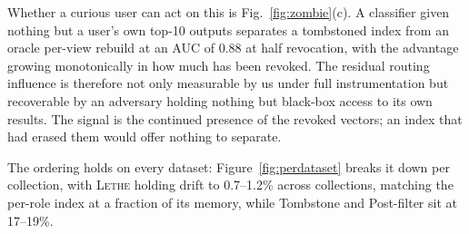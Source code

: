 \documentclass[sigconf, nonacm, review]{acmart}
\begin{document}
Whether a curious user can act on this is Fig.~\ref{fig:zombie}(c). A
classifier given nothing but a user's own top-10 outputs separates a
tombstoned index from an oracle per-view rebuild at an AUC of 0.88 at half
revocation, with the advantage growing
monotonically in how much has been revoked. The residual routing influence
is therefore not only measurable by us under full instrumentation but
recoverable by an adversary holding nothing but black-box access to its own
results. The signal is the continued presence of the revoked vectors; an
index that had erased them would offer nothing to separate.

The ordering holds on every dataset: Figure~\ref{fig:perdataset} breaks it
down per collection, with \textsc{Lethe} holding drift to 0.7--1.2\% across
collections, matching the per-role index at a fraction of its memory, while Tombstone and Post-filter sit at 17--19\%.
\end{document}
